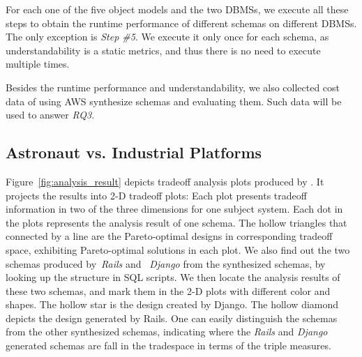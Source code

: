 \documentclass[10pt,conference]{IEEEtran}
\begin{document}
For each one of the five object models and the two DBMSs, we execute all these steps to obtain the runtime performance of different schemas on different DBMSs. The only exception is \textit{Step \#5}. We execute it only once for each schema, as understandability is a static metrics, and thus there is no need to execute multiple times.

Besides the runtime performance and understandability, we also collected cost data of using AWS synthesize schemas and evaluating them. Such data will be used to answer \textit{RQ3}. 



 




\subsection{Astronaut vs. Industrial Platforms}
Figure~\ref{fig:analysis_result} depicts tradeoff analysis plots produced by \@approach.
It projects the results into 2-D tradeoff plots: Each plot presents tradeoff information in two of the three dimensions for one subject system. 
Each dot in the plots represents the analysis result of one schema. 
The hollow triangles that connected by a line are the Pareto-optimal designs in corresponding tradeoff space, exhibiting Pareto-optimal solutions in each plot. 
We also find out the two schemas produced by~{\em Rails} and ~{\em Django} from the synthesized schemas, by looking up the structure in SQL scripts. We then locate the analysis results of these two schemas, and mark them in the 2-D plots with different color and shapes. 
The hollow star is the design created by Django. The hollow diamond depicts the design generated by Rails.
One can easily distinguish the schemas from the other synthesized schemas, indicating where the {\em Rails} and {\em Django} generated schemas are fall in the tradespace in terms of the triple measures.
\end{document}
